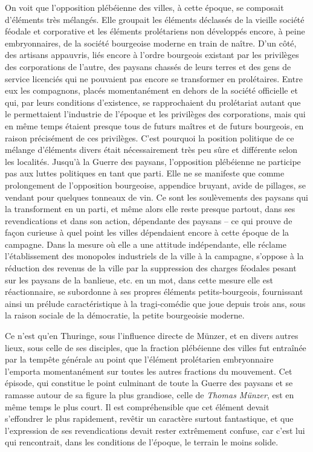 \documentclass[french,twoside]{book} %
\begin{document}
On voit que l’opposition plébéienne des villes, à cette époque, se composait d’éléments très mélangés. Elle groupait les éléments déclassés de la vieille société féodale et corporative et les éléments prolétariens non développés encore, à peine embryonnaires, de la société bourgeoise moderne en train de naître. D’un côté, des artisans appauvris, liés encore à l’ordre bourgeois existant par les privilèges des corporations de l’autre, des paysans chassés de leurs terres et des gens de service licenciés qui ne pouvaient pas encore se transformer en prolétaires. Entre eux les compagnons, placés momentanément en dehors de la société officielle et qui, par leurs conditions d’existence, se rapprochaient du prolétariat autant que le permettaient l’industrie de l’époque et les privilèges des corporations, mais qui en même temps étaient presque tous de futurs maîtres et de futurs bourgeois, en raison précisément de ces privilèges. C’est pourquoi la position politique de ce mélange d’éléments divers était nécessairement très peu sûre et différente selon les localités. Jusqu’à la Guerre des paysans, l’opposition plébéienne ne participe pas aux luttes politiques en tant que parti. Elle ne se manifeste que comme prolongement de l’opposition bourgeoise, appendice bruyant, avide de pillages, se vendant pour quelques tonneaux de vin. Ce sont les soulèvements des paysans qui la transforment en un parti, et même alors elle reste presque partout, dans ses revendications et dans son action, dépendante des paysans – ce qui prouve de façon curieuse à quel point les villes dépendaient encore à cette époque de la campagne. Dans la mesure où elle a une attitude indépendante, elle réclame l’établissement des monopoles industriels de la ville à la campagne, s’oppose à la réduction des revenus de la ville par la suppression des charges féodales pesant sur les paysans de la banlieue, etc. en un mot, dans cette mesure elle est réactionnaire, se subordonne à ses propres éléments petits-bourgeois, fournissant ainsi un prélude caractéristique à la tragi-comédie que joue depuis trois ans, sous la raison sociale de la démocratie, la petite bourgeoisie moderne.\par
Ce n’est qu’en Thuringe, sous l’influence directe de Münzer, et en divers autres lieux, sous celle de ses disciples, que la fraction plébéienne des villes fut entraînée par la tempête générale au point que l’élément prolétarien embryonnaire l’emporta momentanément sur toutes les autres fractions du mouvement. Cet épisode, qui constitue le point culminant de toute la Guerre des paysans et se ramasse autour de sa figure la plus grandiose, celle de \emph{Thomas Münzer}, est en même temps le plus court. Il est compréhensible que cet élément devait s’effondrer le plus rapidement, revêtir un caractère surtout fantastique, et que l’expression de ses revendications devait rester extrêmement confuse, car c’est lui qui rencontrait, dans les conditions de l’époque, le terrain le moins solide.\par
\end{document}
